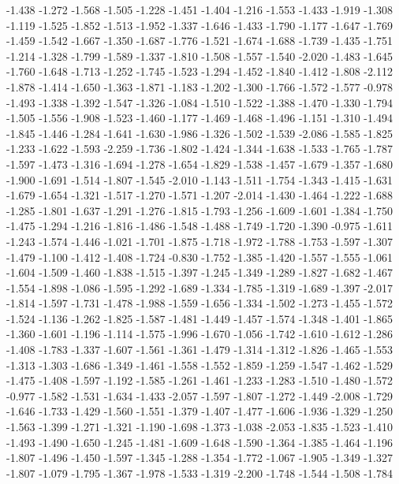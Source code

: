 \documentclass[9pt]{article}
\theoremstyle{plain}
\theoremstyle{definition}
\theoremstyle{remark}
\numberwithin{equation}{section}
\begin{document}
-1.438
-1.272
-1.568
-1.505
-1.228
-1.451
-1.404
-1.216
-1.553
-1.433
-1.919
-1.308
-1.119
-1.525
-1.852
-1.513
-1.952
-1.337
-1.646
-1.433
-1.790
-1.177
-1.647
-1.769
-1.459
-1.542
-1.667
-1.350
-1.687
-1.776
-1.521
-1.674
-1.688
-1.739
-1.435
-1.751
-1.214
-1.328
-1.799
-1.589
-1.337
-1.810
-1.508
-1.557
-1.540
-2.020
-1.483
-1.645
-1.760
-1.648
-1.713
-1.252
-1.745
-1.523
-1.294
-1.452
-1.840
-1.412
-1.808
-2.112
-1.878
-1.414
-1.650
-1.363
-1.871
-1.183
-1.202
-1.300
-1.766
-1.572
-1.577
-0.978
-1.493
-1.338
-1.392
-1.547
-1.326
-1.084
-1.510
-1.522
-1.388
-1.470
-1.330
-1.794
-1.505
-1.556
-1.908
-1.523
-1.460
-1.177
-1.469
-1.468
-1.496
-1.151
-1.310
-1.494
-1.845
-1.446
-1.284
-1.641
-1.630
-1.986
-1.326
-1.502
-1.539
-2.086
-1.585
-1.825
-1.233
-1.622
-1.593
-2.259
-1.736
-1.802
-1.424
-1.344
-1.638
-1.533
-1.765
-1.787
-1.597
-1.473
-1.316
-1.694
-1.278
-1.654
-1.829
-1.538
-1.457
-1.679
-1.357
-1.680
-1.900
-1.691
-1.514
-1.807
-1.545
-2.010
-1.143
-1.511
-1.754
-1.343
-1.415
-1.631
-1.679
-1.654
-1.321
-1.517
-1.270
-1.571
-1.207
-2.014
-1.430
-1.464
-1.222
-1.688
-1.285
-1.801
-1.637
-1.291
-1.276
-1.815
-1.793
-1.256
-1.609
-1.601
-1.384
-1.750
-1.475
-1.294
-1.216
-1.816
-1.486
-1.548
-1.488
-1.749
-1.720
-1.390
-0.975
-1.611
-1.243
-1.574
-1.446
-1.021
-1.701
-1.875
-1.718
-1.972
-1.788
-1.753
-1.597
-1.307
-1.479
-1.100
-1.412
-1.408
-1.724
-0.830
-1.752
-1.385
-1.420
-1.557
-1.555
-1.061
-1.604
-1.509
-1.460
-1.838
-1.515
-1.397
-1.245
-1.349
-1.289
-1.827
-1.682
-1.467
-1.554
-1.898
-1.086
-1.595
-1.292
-1.689
-1.334
-1.785
-1.319
-1.689
-1.397
-2.017
-1.814
-1.597
-1.731
-1.478
-1.988
-1.559
-1.656
-1.334
-1.502
-1.273
-1.455
-1.572
-1.524
-1.136
-1.262
-1.825
-1.587
-1.481
-1.449
-1.457
-1.574
-1.348
-1.401
-1.865
-1.360
-1.601
-1.196
-1.114
-1.575
-1.996
-1.670
-1.056
-1.742
-1.610
-1.612
-1.286
-1.408
-1.783
-1.337
-1.607
-1.561
-1.361
-1.479
-1.314
-1.312
-1.826
-1.465
-1.553
-1.313
-1.303
-1.686
-1.349
-1.461
-1.558
-1.552
-1.859
-1.259
-1.547
-1.462
-1.529
-1.475
-1.408
-1.597
-1.192
-1.585
-1.261
-1.461
-1.233
-1.283
-1.510
-1.480
-1.572
-0.977
-1.582
-1.531
-1.634
-1.433
-2.057
-1.597
-1.807
-1.272
-1.449
-2.008
-1.729
-1.646
-1.733
-1.429
-1.560
-1.551
-1.379
-1.407
-1.477
-1.606
-1.936
-1.329
-1.250
-1.563
-1.399
-1.271
-1.321
-1.190
-1.698
-1.373
-1.038
-2.053
-1.835
-1.523
-1.410
-1.493
-1.490
-1.650
-1.245
-1.481
-1.609
-1.648
-1.590
-1.364
-1.385
-1.464
-1.196
-1.807
-1.496
-1.450
-1.597
-1.345
-1.288
-1.354
-1.772
-1.067
-1.905
-1.349
-1.327
-1.807
-1.079
-1.795
-1.367
-1.978
-1.533
-1.319
-2.200
-1.748
-1.544
-1.508
-1.784
\end{document}
